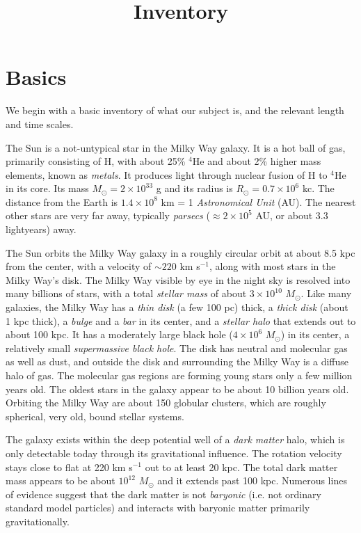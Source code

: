 \title{\bf Inventory}

\section{Basics}

We begin with a basic inventory of what our subject is, and the
relevant length and time scales.

The Sun is a not-untypical star in the Milky Way galaxy. It is a hot
ball of gas, primarily consisting of H, with about 25\% ${}^4$He and
about 2\% higher mass elements, known as {\it metals}. It produces
light through nuclear fusion of H to ${}^4$He in its core. Its mass
$M_\odot = 2\times 10^{33}$ g and its radius is $R_\odot = 0.7 \times
10^6$ kc. The distance from the Earth is $1.4\times 10^8$ km = 1 {\it
  Astronomical Unit} (AU). The nearest other stars are very far away,
typically {\it parsecs} ($\approx 2 \times 10^5$ AU, or about 3.3
lightyears) away.

The Sun orbits the Milky Way galaxy in a roughly circular orbit at
about 8.5 kpc from the center, with a velocity of $\sim 220$ km
s$^{-1}$, along with most stars in the Milky Way's disk. The Milky Way
visible by eye in the night sky is resolved into many billions of
stars, with a total {\it stellar mass} of about $3\times 10^{10}$
$M_\odot$. Like many galaxies, the Milky Way has a {\it thin disk} (a
few 100 pc) thick, a {\it thick disk} (about 1 kpc thick), a {\it
  bulge} and a {\it bar} in its center, and a {\it stellar halo} that
extends out to about 100 kpc. It has a moderately large black hole
($4\times 10^6$ $M_\odot$) in its center, a relatively small {\it
  supermassive black hole}. The disk has neutral and molecular gas as
well as dust, and outside the disk and surrounding the Milky Way is a
diffuse halo of gas. The molecular gas regions are forming young stars
only a few million years old. The oldest stars in the galaxy appear to
be about 10 billion years old. Orbiting the Milky Way are about 150
globular clusters, which are roughly spherical, very old, bound
stellar systems.

The galaxy exists within the deep potential well of a {\it dark
  matter} halo, which is only detectable today through its
gravitational influence. The rotation velocity stays close to flat at
220 km s$^{-1}$ out to at least 20 kpc. The total dark matter mass
appears to be about $10^{12}$ $M_\odot$ and it extends past 100
kpc. Numerous lines of evidence suggest that the dark matter is not
{\it baryonic} (i.e. not ordinary standard model particles) and
interacts with baryonic matter primarily gravitationally.

